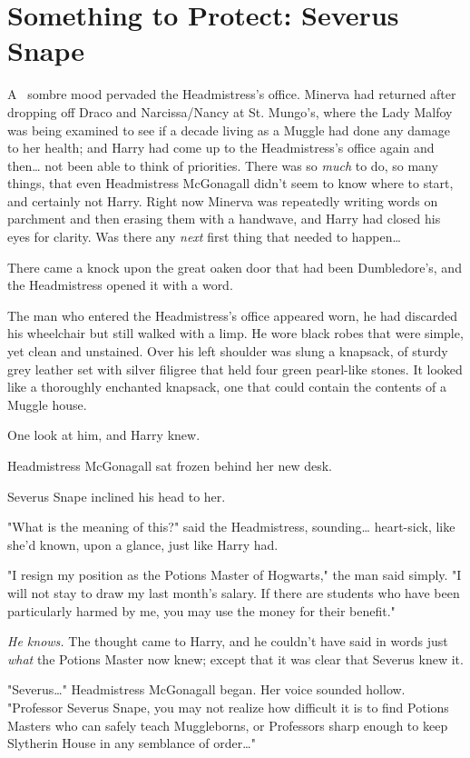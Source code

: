 \chapter{Something to Protect: Severus Snape}

\lettrine{A}{~} sombre mood
pervaded the Headmistress's office. Minerva had returned after dropping off
Draco and Narcissa/Nancy at St. Mungo's, where the Lady Malfoy was being
examined to see if a decade living as a Muggle had done any damage to her
health; and Harry had come up to the Headmistress's office again and
then{\ldots} not been able to think of priorities. There was so \emph{much} to
do, so many things, that even Headmistress McGonagall didn't seem to know where
to start, and certainly not Harry. Right now Minerva was repeatedly writing
words on parchment and then erasing them with a handwave, and Harry had closed
his eyes for clarity. Was there any \emph{next} first thing that needed to
happen{\ldots}

There came a knock upon the great oaken door that had been Dumbledore's, and
the Headmistress opened it with a word.

The man who entered the Headmistress's office appeared worn, he had discarded
his wheelchair but still walked with a limp. He wore black robes that were
simple, yet clean and unstained. Over his left shoulder was slung a knapsack,
of sturdy grey leather set with silver filigree that held four green pearl-like
stones. It looked like a thoroughly enchanted knapsack, one that could contain
the contents of a Muggle house.

One look at him, and Harry knew.

Headmistress McGonagall sat frozen behind her new desk.

Severus Snape inclined his head to her.

"What is the meaning of this?" said the Headmistress, sounding{\ldots}
heart-sick, like she'd known, upon a glance, just like Harry had.

"I resign my position as the Potions Master of Hogwarts," the man said simply.
"I will not stay to draw my last month's salary. If there are students who have
been particularly harmed by me, you may use the money for their benefit."

\emph{He knows.} The thought came to Harry, and he couldn't have said in words
just \emph{what} the Potions Master now knew; except that it was clear that
Severus knew it.

"Severus{\ldots}" Headmistress McGonagall began. Her voice sounded hollow.
"Professor Severus Snape, you may not realize how difficult it is to find
Potions Masters who can safely teach Muggleborns, or Professors sharp enough to
keep Slytherin House in any semblance of order{\ldots}"

